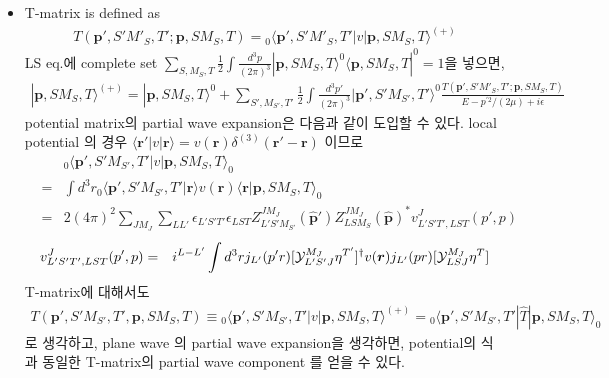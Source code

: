 \documentclass[10pt]{article}
\def\bm{\boldsymbol}
\newcommand{\bea}{\begin{eqnarray}}
\newcommand{\eea}{\end{eqnarray}}
\newcommand{\no}{\nonumber \\}
\def\vp{{\bm p}}
\def\vr{{\bm r}}
\def\la{\langle}
\def\ra{\rangle}
\begin{document}
\begin{itemize}
\item
T-matrix is defined as
\bea
T(\vp',S' M'_S,T';\vp,S M_S,T)
={}_0\la \vp', S' M'_S,T'|v|\vp,S M_S,T\ra^{(+)}
\eea
LS eq.에 complete set 
$\sum_{S,M_S,T}\frac{1}{2}\int \frac{d^3 p}{(2\pi)^3} |\vp,S M_S,T\ra^0\la \vp,S M_S,T|^0=1$을 넣으면,
\bea
|\vp,S M_S,T\ra^{(+)}=|\vp,S M_S,T\ra^{0}
+\sum_{S',M_{S'},T'}\frac{1}{2}
\int \frac{d^3 p'}{(2\pi)^3} |\vp',S' M_{S'},T'\ra^0
\frac{T(\vp',S' M'_S,T';\vp,S M_S,T)}{E-p^{'2}/(2\mu)+ i\epsilon} 
\eea
potential matrix의 partial wave expansion은 다음과 같이 도입할 수 있다.
local potential 의 경우 $\la \vr'|v|\vr\ra=v(\vr)\delta^{(3)}(\vr'-\vr)$
이므로
\bea
& &{}_0\la \vp',S' M_{S'},T'|v|\vp,S M_S,T\ra_0\no
&=&\int d^3 r {}_0\la \vp',S' M_{S'},T'|\vr\ra v(\vr)
 \la \vr|\vp,S M_S,T\ra_0 
\no
&=&2(4\pi)^2\sum_{J M_J}\sum_{L L'}\epsilon_{L'S'T'}\epsilon_{LST}
Z^{J M_J}_{L'S'M_{S'}}(\hat{\vp}')Z^{J M_J}_{LSM_{S}}(\hat{\vp})^*
v^{J}_{L'S'T',LST}(p',p) 
\eea
\bea
v^{J}_{L'S'T',LST}(p',p)&=&
i^{L-L'}\int d^3 r j_{L'}(p'r)[{\cal Y}^{M_J}_{L'S'J}\eta^{T'}]^\dagger
v(\vr)j_{L'}(pr)[{\cal Y}^{M_J}_{LSJ}\eta^{T}]
\eea
T-matrix에 대해서도 
\bea
T(\vp',S' M_{S'},T',\vp,S M_S,T)
\equiv {}_0\la \vp',S' M_{S'},T'| v|\vp,S M_S,T\ra^{(+)}
={}_0\la \vp',S' M_{S'},T'| \hat{T} |\vp,S M_S,T\ra_0
\eea
로 생각하고, plane wave 의 partial wave expansion을 생각하면,
potential의 식과 동일한 T-matrix의 partial wave component 를
얻을 수 있다. 


\end{itemize}
\end{document}
